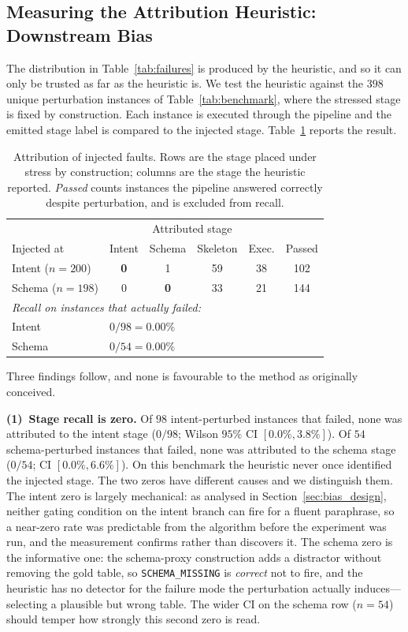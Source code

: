 \documentclass[conference]{IEEEtran}
\begin{document}
\subsection{Measuring the Attribution Heuristic: Downstream Bias}
\label{sec:bias_results}

The distribution in Table~\ref{tab:failures} is produced by the heuristic, and
so it can only be trusted as far as the heuristic is. We test the heuristic
against the $398$ unique perturbation instances of
Table~\ref{tab:benchmark}, where the stressed stage is fixed by construction.
Each instance is executed through the pipeline and the emitted stage label is
compared to the injected stage. Table~\ref{tab:confusion} reports the result.

\begin{table}[htbp]
\centering
\caption{Attribution of injected faults. Rows are the stage placed under
stress by construction; columns are the stage the heuristic reported.
\emph{Passed} counts instances the pipeline answered correctly despite
perturbation, and is excluded from recall.}
\begin{tabular}{lccccc}
\toprule
& \multicolumn{4}{c}{Attributed stage} & \\
Injected at & Intent & Schema & Skeleton & Exec. & Passed \\
\midrule
Intent ($n{=}200$) & \textbf{0} & 1 & 59 & 38 & 102 \\
Schema ($n{=}198$) & 0 & \textbf{0} & 33 & 21 & 144 \\
\midrule
\multicolumn{6}{l}{\emph{Recall on instances that actually failed:}} \\
Intent & \multicolumn{5}{l}{$0/98 = \mathbf{0.00\%}$} \\
Schema & \multicolumn{5}{l}{$0/54 = \mathbf{0.00\%}$} \\
\bottomrule
\end{tabular}
\label{tab:confusion}
\end{table}

Three findings follow, and none is favourable to the method as originally
conceived.

\noindent\textbf{(1)~Stage recall is zero.} Of $98$ intent-perturbed instances
that failed, none was attributed to the intent stage ($0/98$; Wilson $95\%$ CI
$[0.0\%, 3.8\%]$). Of $54$ schema-perturbed instances that failed, none was
attributed to the schema stage ($0/54$; CI $[0.0\%, 6.6\%]$). On this benchmark
the heuristic never once identified the injected stage. The two zeros have
different causes and we distinguish them. The intent zero is largely
mechanical: as analysed in Section~\ref{sec:bias_design}, neither gating
condition on the intent branch can fire for a fluent paraphrase, so a
near-zero rate was predictable from the algorithm before the experiment was
run, and the measurement confirms rather than discovers it. The schema zero is
the informative one: the schema-proxy construction adds a distractor without
removing the gold table, so \texttt{SCHEMA\_MISSING} is \emph{correct} not to
fire, and the heuristic has no detector for the failure mode the perturbation
actually induces---selecting a plausible but wrong table. The wider CI on the
schema row ($n=54$) should temper how strongly this second zero is read.
\end{document}
